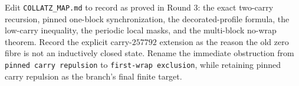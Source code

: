 \documentclass[11pt]{article}
\theoremstyle{remark}
\begin{document}
Edit \texttt{COLLATZ\_MAP.md} to record as proved in Round 3: the exact two-carry recursion, pinned one-block synchronization, the decorated-profile formula, the low-carry inequality, the periodic local masks, and the multi-block no-wrap theorem.  Record the explicit carry-$257792$ extension as the reason the old zero fibre is not an inductively closed state.  Rename the immediate obstruction from \texttt{pinned carry repulsion} to \texttt{first-wrap exclusion}, while retaining pinned carry repulsion as the branch's final finite target.
\end{document}
